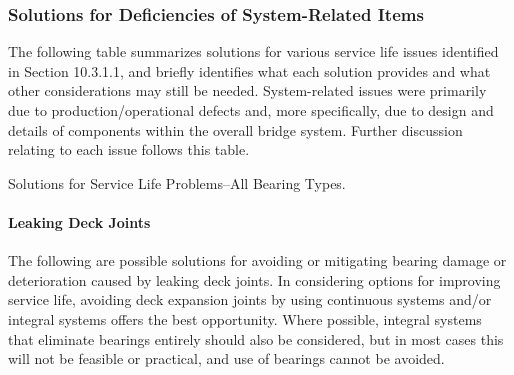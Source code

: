 \subsubsection{Solutions for Deficiencies of System-Related Items}
The following table summarizes solutions for various service life issues identified in Section 10.3.1.1, and briefly
identifies what each solution provides and what other considerations may still be needed. System-related issues were primarily due to production/operational defects and, more specifically, due to design and details of components
within the overall bridge system. Further discussion relating to each issue follows this table.

\begin{table}
  \caption{Solutions for Service Life Problems–All Bearing Types.}
  \label{tab:solution-all-bearing}
\end{table}


\paragraph{Leaking Deck Joints}
The following are possible solutions for avoiding or mitigating bearing damage or deterioration caused by
leaking deck joints. In considering options for improving service life, avoiding deck expansion joints by using
continuous systems and/or integral systems offers the best opportunity. Where possible, integral systems that
eliminate bearings entirely should also be considered, but in most cases this will not be feasible or practical, and use
of bearings cannot be avoided.

